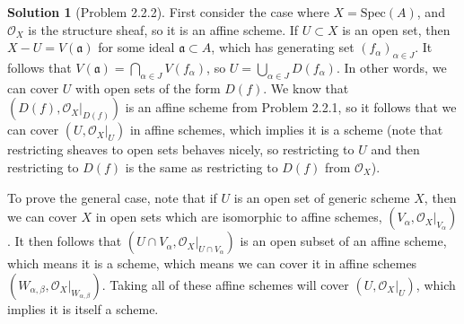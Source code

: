 \documentclass[aps,pra,showpacs,notitlepage,onecolumn,superscriptaddress,nofootinbib]{revtex4-1}
\theoremstyle{definition}
\newtheorem{solution}{Solution}[section]
\begin{document}
\begin{solution}[Problem 2.2.2]
  First consider the case where $X = \text{Spec}(A)$, and $\mathcal{O}_X$ is the structure sheaf, so it is an affine scheme. If $U \subset X$ is an open set, then $X - U = V(\mathfrak{a})$ for some
  ideal $\mathfrak{a} \subset A$, which has generating set $(f_{\alpha})_{\alpha \in J}$. It follows that $V(\mathfrak{a}) = \bigcap_{\alpha \in J} V(f_{\alpha})$, so $U = \bigcup_{\alpha \in J} D(f_{\alpha})$.
  In other words, we can cover $U$ with open sets of the form $D(f)$. We know that $(D(f), \mathcal{O}_X|_{D(f)})$ is an affine scheme from Problem 2.2.1, so it follows that we can cover $(U, \mathcal{O}_X|_U)$ in affine
  schemes, which implies it is a scheme (note that restricting sheaves to open sets behaves nicely, so restricting to $U$ and then restricting to $D(f)$ is the same as restricting to $D(f)$ from $\mathcal{O}_X$).

  To prove the general case, note that if $U$ is an open set of generic scheme $X$, then we can cover $X$ in open sets which are isomorphic to affine schemes, $(V_{\alpha}, \mathcal{O}_X|_{V_{\alpha}})$. It then
  follows that $(U \cap V_{\alpha}, \mathcal{O}_X|_{U \cap V_{\alpha}})$ is an open subset of an affine scheme, which means it is a scheme, which means we can cover it in affine schemes $(W_{\alpha, \beta}, \mathcal{O}_X|_{W_{\alpha, \beta}})$.
  Taking all of these affine schemes will cover $(U, \mathcal{O}_X|_U)$, which implies it is itself a scheme.
  \end{solution}
\end{document}
